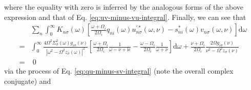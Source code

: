 where the equality with zero is inferred by the analogous forms of the above expression and that of Eq. \eqref{eq:uv-minus-vu-integral}. Finally, we can see that
\begin{equation}
\begin{split}
&\sum_n\int_0^\infty K_{n\sigma}(\omega)\left[\frac{\omega + \Omega_i}{2\Omega_i}q_{ni}(\omega)u^{\prime*}_{n\sigma}(\omega,\nu) - s_{ni}^*(\omega)v_{n\sigma}(\omega,\nu)\right]\mathrm{d}\omega\\
= &\int_0^\infty\frac{4\Omega^2\Sigma_\sigma^2(\omega)g_{i\sigma}(\nu)}{|\omega^2 - \Omega^2z_\sigma(\omega)|^2}\left[\frac{\omega + \Omega_i}{2\Omega_i}\frac{1}{\omega - \nu  + \mathrm{i}\epsilon} - \frac{\omega - \Omega_i}{2\Omega_i}\frac{1}{\omega + \nu }\right]\mathrm{d}\omega + \frac{\nu  + \Omega_i}{2\Omega_i}\frac{2\Omega g_{i\sigma}(\nu)}{\nu ^2 - \Omega^2z_\sigma(\nu )}\\
= &\;0
\end{split}
\end{equation}
via the process of Eq. \eqref{eq:qu-minus-sv-integral} (note the overall complex conjugate) and
